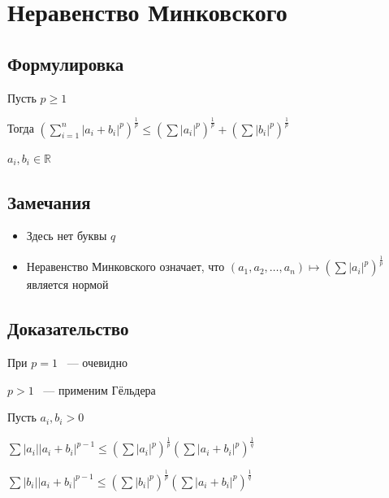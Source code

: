 \documentclass{article}
\begin{document}
    \newpage
    
    \section{Неравенство Минковского}
    
        \subsection{Формулировка}
        
            Пусть $p \geq 1$
            
            Тогда $\left( \sum\limits_{i = 1}^n |a_i + b_i|^p\right)^{\frac{1}{p}} \leq \left( \sum |a_i|^p \right)^{\frac{1}{p}} + \left( \sum |b_i|^p \right)^{\frac{1}{p}}$
            
            $a_i, b_i \in \mathbb{R}$
            
        \subsection{Замечания}
        
            \begin{itemize}
            
                \item Здесь нет буквы $q$
                
                \item Неравенство Минковского означает, что $(a_1, a_2, \ldots, a_n) \mapsto \left( \sum |a_i|^p \right)^{\frac{1}{p}}$ является нормой
                
            \end{itemize}

        \subsection{Доказательство}
        
            При $p = 1$ ~--- очевидно
            
            $p > 1$ ~--- применим Гёльдера
            
            Пусть $a_i, b_i > 0$
            
            $\sum |a_i| |a_i + b_i|^{p - 1} \leq \left( \sum |a_i|^p \right)^{\frac{1}{p}} \left( \sum |a_i + b_i|^p \right)^{\frac{1}{q}}$
            
            $\sum |b_i| |a_i + b_i|^{p - 1} \leq \left( \sum |b_i|^p \right)^{\frac{1}{p}} \left( \sum |a_i + b_i|^p \right)^{\frac{1}{q}}$
            
\end{document}
